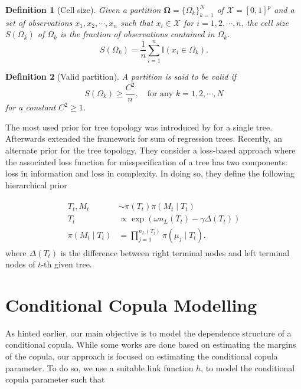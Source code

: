 \documentclass{amsart}
\newtheorem{definition}{Definition}[section]
\begin{document}
\begin{definition}[Cell size] Given a partition $\mathbf{\Omega} = \{\Omega_k\}_{k=1}^N$ of $\mathcal{X} = [0,1]^p$ and a set of observations $x_1, x_2, \cdots, x_n$ such that $x_i\in \mathcal{X}$ for $i=1,2,\cdots, n$, the cell size $S(\Omega_k)$ of $\Omega_k$
	is the fraction of observations contained in $\Omega_k$.
	\begin{equation*}
		S(\Omega_k) = \frac{1}{n}\sum_{i=1}^n \mathbb{I}(x_i\in \Omega_k).
	\end{equation*}
\end{definition}

\begin{definition}[Valid partition]
	A partition is said to be valid if
	\begin{equation*}
		S(\Omega_k) \ge \frac{C^2}{n}, \quad\text{for any } k=1,2,\cdots, N
	\end{equation*}
	for a constant $C^2\ge 1$.
\end{definition}

The most used prior for tree topology was introduced by \citet{chipman98BCART} for a single tree. Afterwards \citet{chipman2010BART} extended the framework for sum of regression trees. Recently, \citet{serafini2024lossbasedpriortreetopologies} an alternate prior for the tree topology. They consider a loss-based approach \cite{villa_loss-prior} where the associated loss function for misspecification of a tree has two components: loss in information and loss in complexity. In doing so, they define the following hierarchical prior

\begin{align}\label{eq:L-BART}
	\begin{split}
		T_t, M_t &\sim \pi(T_t)\pi(M_t\mid T_t)\\
		T_t &\propto \exp\left(\omega n_L(T_t)-\gamma\Delta(T_t)\right)\\
		\pi(M_t\mid T_t) & = \prod_{j=1}^{n_L(T_t)}\pi(\mu_j\mid T_t).
	\end{split}
\end{align}
where $\Delta(T_t)$ is the difference between right terminal nodes and left terminal nodes of $t$-th given tree.


\section{Conditional Copula Modelling}\label{sec:cond:cop}

As hinted earlier, our main objective is to model the dependence structure of a conditional copula. While some works are done based on estimating the margins of the copula, our approach is focused on estimating the conditional copula parameter. To do so, we use a suitable link function $h$, to model the conditional copula parameter such that 
\end{document}
